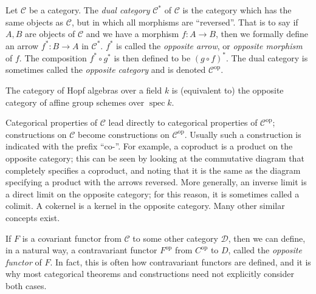 \documentclass[12pt]{article}
\DeclareMathOperator{\op}{op}
\begin{document}
Let $\mathcal{C}$ be a category. The \emph{dual category} $\mathcal{C}^{*}$ of $\mathcal{C}$ is the category which has the same objects as $\mathcal{C}$, but in which all morphisms are ``reversed''. That is to say if $A,B$ are objects of $\mathcal{C}$ and we have a morphism $f: A \to B$, then we formally define an arrow $f^{*}: B \to A$ in $\mathcal{C}^{*}$.   $f^*$ is called the \emph{opposite arrow}, or \emph{opposite morphism} of $f$.  The composition $f^{*}\circ g^{*}$ is then defined to be $(g\circ f)^{*}$. The dual category is sometimes called the \emph{opposite category} and is denoted $\mathcal{C}^{\op}$.

The category of Hopf algebras over a field $k$ is (equivalent to) the opposite category of affine group schemes over $\operatorname{spec} k$.

Categorical properties of $\mathcal{C}$ lead directly to categorical properties of $\mathcal{C}^{\op}$; constructions on $\mathcal{C}$ become constructions on $\mathcal{C}^{\op}$.  Usually such a construction is indicated with the prefix ``co-''.  For example, a coproduct is a product on the opposite category; this can be seen by looking at the commutative diagram that completely specifies a coproduct, and noting that it is the same as the diagram specifying a product with the arrows reversed. More generally, an inverse limit is a direct limit on the opposite category; for this reason, it is sometimes called a colimit. A cokernel is a kernel in the opposite category.  Many other similar concepts exist.

If $F$ is a covariant functor from $\mathcal{C}$ to some other category $\mathcal{D}$, then we can define, in a natural way, a contravariant functor $F^{\op}$ from $C^{\op}$ to $D$, called the \emph{opposite functor} of $F$. In fact, this is often how contravariant functors are defined, and it is why most categorical theorems and constructions need not explicitly consider both cases.
\end{document}
